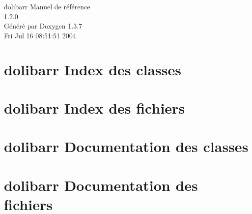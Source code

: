 \documentclass[a4paper]{book}
\begin{document}
\begin{titlepage}
\vspace*{7cm}
\begin{center}
{\Large dolibarr Manuel de r\'{e}f\'{e}rence\\[1ex]\large 1.2.0 }\\
\vspace*{1cm}
{\large G\'{e}n\'{e}r\'{e} par Doxygen 1.3.7}\\
\vspace*{0.5cm}
{\small Fri Jul 16 08:51:51 2004}\\
\end{center}
\end{titlepage}
\clearemptydoublepage
{}
\tableofcontents
\clearemptydoublepage
{}
\chapter{dolibarr Index des classes}

\chapter{dolibarr Index des fichiers}

\chapter{dolibarr Documentation des classes}




\chapter{dolibarr Documentation des fichiers}









\printindex
\end{document}
